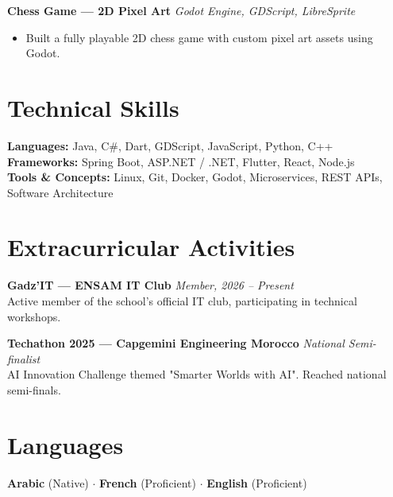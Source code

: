 \documentclass[a4paper,11pt]{article}
\begin{document}
\textbf{Chess Game — 2D Pixel Art} \hfill \textit{Godot Engine, GDScript, LibreSprite}
\begin{itemize}[leftmargin=*, nosep, topsep=2pt]
  \item Built a fully playable 2D chess game with custom pixel art assets using Godot.
\end{itemize}

\section{Technical Skills}

\textbf{Languages:} Java, C\#, Dart, GDScript, JavaScript, Python, C++ \\
\textbf{Frameworks:} Spring Boot, ASP.NET / .NET, Flutter, React, Node.js \\
\textbf{Tools \& Concepts:} Linux, Git, Docker, Godot, Microservices, REST APIs, Software Architecture



\section{Extracurricular Activities}

\textbf{Gadz'IT — ENSAM IT Club} \hfill \textit{Member, 2026 -- Present} \\
Active member of the school's official IT club, participating in technical workshops.

\vspace{2pt}

\textbf{Techathon 2025 — Capgemini Engineering Morocco} \hfill \textit{National Semi-finalist} \\
AI Innovation Challenge themed "Smarter Worlds with AI". Reached national semi-finals.



\section{Languages}

\textbf{Arabic} (Native) $\cdot$ \textbf{French} (Proficient) $\cdot$ \textbf{English} (Proficient)
\end{document}
